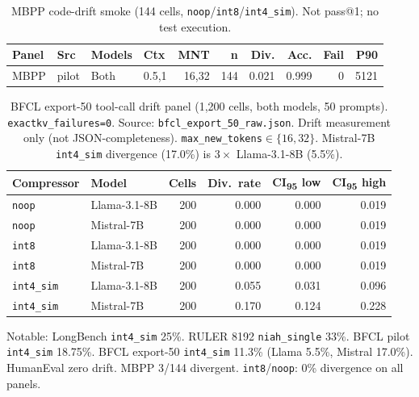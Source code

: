 \documentclass[11pt]{article}
\begin{document}
\begin{table}[htbp]
\centering\scriptsize
\setlength{\tabcolsep}{3.5pt}
\renewcommand{\arraystretch}{1.05}
\begin{tabular}{@{}llllrrrrrr@{}}
\toprule
\textbf{Panel} & \textbf{Src} & \textbf{Models} & \textbf{Ctx} & \textbf{MNT} & \textbf{n} & \textbf{Div.} & \textbf{Acc.} & \textbf{Fail} & \textbf{P90} \\ \midrule
MBPP & pilot & Both & 0.5,1 & 16,32 & 144 & 0.021 & 0.999 & 0 & 5121 \\
\bottomrule
\end{tabular}
\caption{MBPP code-drift smoke (144 cells, \texttt{noop}/\texttt{int8}/\texttt{int4\_sim}).
Not pass@1; no test execution.}
\label{tab:external-mbpp}
\end{table}

\begin{table}[htbp]
\centering\scriptsize
\renewcommand{\arraystretch}{1.05}
\begin{tabular}{llrrrr}
\toprule
\textbf{Compressor} & \textbf{Model} & \textbf{Cells} & \textbf{Div.\ rate} & \textbf{CI\textsubscript{95} low} & \textbf{CI\textsubscript{95} high} \\ \midrule
\texttt{noop} & Llama-3.1-8B & 200 & 0.000 & 0.000 & 0.019 \\
\texttt{noop} & Mistral-7B & 200 & 0.000 & 0.000 & 0.019 \\
\texttt{int8} & Llama-3.1-8B & 200 & 0.000 & 0.000 & 0.019 \\
\texttt{int8} & Mistral-7B & 200 & 0.000 & 0.000 & 0.019 \\
\texttt{int4\_sim} & Llama-3.1-8B & 200 & 0.055 & 0.031 & 0.096 \\
\texttt{int4\_sim} & Mistral-7B & 200 & 0.170 & 0.124 & 0.228 \\
\bottomrule
\end{tabular}
\caption{BFCL export-50 tool-call drift panel (1,200 cells, both models, 50 prompts).
\texttt{exactkv\_failures=0}. Source: \texttt{bfcl\_export\_50\_raw.json}.
Drift measurement only (not JSON-completeness). \texttt{max\_new\_tokens}$\in\{16,32\}$.
Mistral-7B \texttt{int4\_sim} divergence (17.0\%) is $3\times$ Llama-3.1-8B (5.5\%).}
\label{tab:bfcl-export50}
\end{table}

Notable: LongBench \texttt{int4\_sim} 25\%. RULER 8192 \texttt{niah\_single} 33\%. BFCL pilot \texttt{int4\_sim} 18.75\%. BFCL export-50 \texttt{int4\_sim} 11.3\%
(Llama 5.5\%, Mistral 17.0\%). HumanEval zero drift. MBPP 3/144 divergent.
\texttt{int8}/\texttt{noop}: 0\% divergence on all panels.
\end{document}
